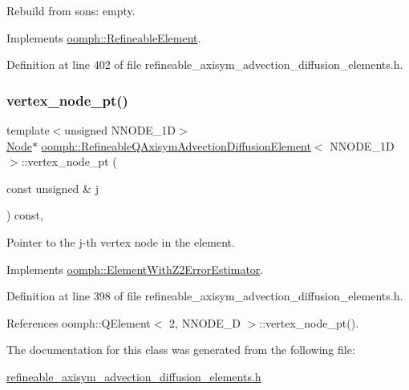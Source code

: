 Rebuild from sons\+: empty. 



Implements \hyperlink{classoomph_1_1RefineableElement_a33324be27833fa4b78279d17158215fa}{oomph\+::\+Refineable\+Element}.



Definition at line 402 of file refineable\+\_\+axisym\+\_\+advection\+\_\+diffusion\+\_\+elements.\+h.

\mbox{\label{classoomph_1_1RefineableQAxisymAdvectionDiffusionElement_ae9d0316ec7fa1f54500e067852e4c259}} 
\subsubsection{\texorpdfstring{vertex\+\_\+node\+\_\+pt()}{vertex\_node\_pt()}}
{\footnotesize\ttfamily template$<$unsigned N\+N\+O\+D\+E\+\_\+1D$>$ \\
\hyperlink{classoomph_1_1Node}{Node}$\ast$ \hyperlink{classoomph_1_1RefineableQAxisymAdvectionDiffusionElement}{oomph\+::\+Refineable\+Q\+Axisym\+Advection\+Diffusion\+Element}$<$ N\+N\+O\+D\+E\+\_\+1D $>$\+::vertex\+\_\+node\+\_\+pt (\begin{DoxyParamCaption}\item[{const unsigned \&}]{j }\end{DoxyParamCaption}) const\hspace{0.3cm}{\ttfamily [inline]}, {\ttfamily [virtual]}}



Pointer to the j-\/th vertex node in the element. 



Implements \hyperlink{classoomph_1_1ElementWithZ2ErrorEstimator_a0eedccc33519f852c5dc2055ddf2774b}{oomph\+::\+Element\+With\+Z2\+Error\+Estimator}.



Definition at line 398 of file refineable\+\_\+axisym\+\_\+advection\+\_\+diffusion\+\_\+elements.\+h.



References oomph\+::\+Q\+Element$<$ 2, N\+N\+O\+D\+E\+\_\+D $>$\+::vertex\+\_\+node\+\_\+pt().



The documentation for this class was generated from the following file\+:\begin{DoxyCompactItemize}
\item 
\hyperlink{refineable__axisym__advection__diffusion__elements_8h}{refineable\+\_\+axisym\+\_\+advection\+\_\+diffusion\+\_\+elements.\+h}\end{DoxyCompactItemize}
